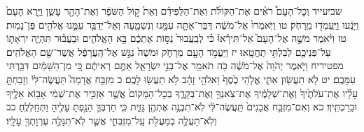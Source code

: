 \documentclass[twoside, openany, parskip=half, 11pt]{book}
\begin{document}
שביעייד וְכׇל־הָעָם֩ רֹאִ֨ים אֶת־הַקּוֹלֹ֜ת וְאֶת־הַלַּפִּידִ֗ם וְאֵת֙ ק֣וֹל הַשֹּׁפָ֔ר וְאֶת־הָהָ֖ר עָשֵׁ֑ן וַיַּ֤רְא הָעָם֙ וַיָּנֻ֔עוּ וַיַּֽעַמְד֖וּ מֵֽרָחֹֽק׃ טו וַיֹּֽאמְרוּ֙ אֶל־מֹשֶׁ֔ה דַּבֵּר־אַתָּ֥ה עִמָּ֖נוּ וְנִשְׁמָ֑עָה וְאַל־יְדַבֵּ֥ר עִמָּ֛נוּ אֱלֹהִ֖ים פֶּן־נָמֽוּת׃ טז וַיֹּ֨אמֶר מֹשֶׁ֣ה אֶל־הָעָם֮ אַל־תִּירָ֒אוּ֒ כִּ֗י לְבַֽעֲבוּר֙ נַסּ֣וֹת אֶתְכֶ֔ם בָּ֖א הָאֱלֹהִ֑ים וּבַעֲב֗וּר תִּהְיֶ֧ה יִרְאָת֛וֹ עַל־פְּנֵיכֶ֖ם לְבִלְתִּ֥י תֶחֱטָֽאוּ׃ יז וַיַּעֲמֹ֥ד הָעָ֖ם מֵרָחֹ֑ק וּמֹשֶׁה֙ נִגַּ֣שׁ אֶל־הָֽעֲרָפֶ֔ל אֲשֶׁר־שָׁ֖ם הָאֱלֹהִֽים׃
מפטיריח וַיֹּ֤אמֶר יְהֹוָה֙ אֶל־מֹשֶׁ֔ה כֹּ֥ה תֹאמַ֖ר אֶל־בְּנֵ֣י יִשְׂרָאֵ֑ל אַתֶּ֣ם רְאִיתֶ֔ם כִּ֚י מִן־הַשָּׁמַ֔יִם דִּבַּ֖רְתִּי עִמָּכֶֽם׃ יט לֹ֥א תַעֲשׂ֖וּן אִתִּ֑י אֱלֹ֤הֵי כֶ֙סֶף֙ וֵאלֹהֵ֣י זָהָ֔ב לֹ֥א תַעֲשׂ֖וּ לָכֶֽם׃ כ מִזְבַּ֣ח אֲדָמָה֮ תַּעֲשֶׂה־לִּי֒ וְזָבַחְתָּ֣ עָלָ֗יו אֶת־עֹלֹתֶ֙יךָ֙ וְאֶת־שְׁלָמֶ֔יךָ אֶת־צֹֽאנְךָ֖ וְאֶת־בְּקָרֶ֑ךָ בְּכׇל־הַמָּקוֹם֙ אֲשֶׁ֣ר אַזְכִּ֣יר אֶת־שְׁמִ֔י אָב֥וֹא אֵלֶ֖יךָ וּבֵרַכְתִּֽיךָ׃ כא וְאִם־מִזְבַּ֤ח אֲבָנִים֙ תַּֽעֲשֶׂה־לִּ֔י לֹֽא־תִבְנֶ֥ה אֶתְהֶ֖ן גָּזִ֑ית כִּ֧י חַרְבְּךָ֛ הֵנַ֥פְתָּ עָלֶ֖יהָ וַתְּחַֽלְלֶֽהָ׃ כב וְלֹֽא־תַעֲלֶ֥ה בְמַעֲלֹ֖ת עַֽל־מִזְבְּחִ֑י אֲשֶׁ֛ר לֹֽא־תִגָּלֶ֥ה עֶרְוָתְךָ֖ עָלָֽיו׃
\end{document}
